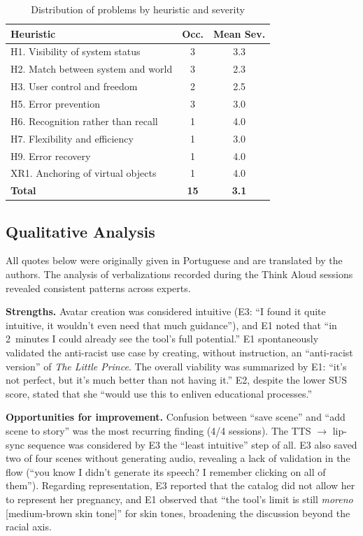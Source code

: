\documentclass[conference]{IEEEtran}
\begin{document}
\begin{table}[htbp]
\caption{Distribution of problems by heuristic and severity}
\label{tab:heuristicas}
\begin{center}
\renewcommand{\arraystretch}{1.2}
\begin{tabular}{|l|c|c|}
\hline
\textbf{Heuristic} & \textbf{Occ.} & \textbf{Mean Sev.} \\
\hline
H1. Visibility of system status    & 3 & 3.3 \\
H2. Match between system and world & 3 & 2.3 \\
H3. User control and freedom       & 2 & 2.5 \\
H5. Error prevention               & 3 & 3.0 \\
H6. Recognition rather than recall & 1 & 4.0 \\
H7. Flexibility and efficiency     & 1 & 3.0 \\
H9. Error recovery                 & 1 & 4.0 \\
XR1. Anchoring of virtual objects  & 1 & 4.0 \\
\hline
\textbf{Total} & \textbf{15} & \textbf{3.1} \\
\hline
\end{tabular}
\end{center}
\end{table}

\subsection{Qualitative Analysis}

All quotes below were originally given in Portuguese and are translated by
the authors. The analysis of verbalizations recorded during the Think Aloud
sessions revealed consistent patterns across experts.

\textbf{Strengths.} Avatar creation was considered intuitive (E3: ``I found
it quite intuitive, it wouldn't even need that much guidance''), and E1 noted
that ``in 2~minutes I could already see the tool's full potential.'' E1
spontaneously validated the anti-racist use case by creating, without
instruction, an ``anti-racist version'' of \textit{The Little Prince}. The
overall viability was summarized by E1: ``it's not perfect, but it's much
better than not having it.'' E2, despite the lower SUS score, stated that she
``would use this to enliven educational processes.''

\textbf{Opportunities for improvement.} Confusion between ``save scene'' and
``add scene to story'' was the most recurring finding (4/4 sessions). The
TTS $\to$ lip-sync sequence was considered by E3 the ``least intuitive'' step
of all. E3 also saved two of four scenes without generating audio, revealing
a lack of validation in the flow (``you know I didn't generate its speech? I
remember clicking on all of them''). Regarding representation, E3 reported
that the catalog did not allow her to represent her pregnancy, and E1
observed that ``the tool's limit is still \textit{moreno} [medium-brown skin
tone]'' for skin tones, broadening the discussion beyond the racial axis.
\end{document}
